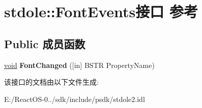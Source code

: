 \hypertarget{interfacestdole_1_1_font_events}{}\section{stdole\+:\+:Font\+Events接口 参考}
\label{interfacestdole_1_1_font_events}
\subsection*{Public 成员函数}
\begin{DoxyCompactItemize}
\item 
\mbox{\label{interfacestdole_1_1_font_events_a8d8dbf708ee910d4c5145bfdd0d3bd62}} 
\hyperlink{interfacevoid}{void} {\bfseries Font\+Changed} (\mbox{[}in\mbox{]} B\+S\+TR Property\+Name)
\end{DoxyCompactItemize}


该接口的文档由以下文件生成\+:\begin{DoxyCompactItemize}
\item 
E\+:/\+React\+O\+S-\/0../sdk/include/psdk/stdole2.\+idl\end{DoxyCompactItemize}
